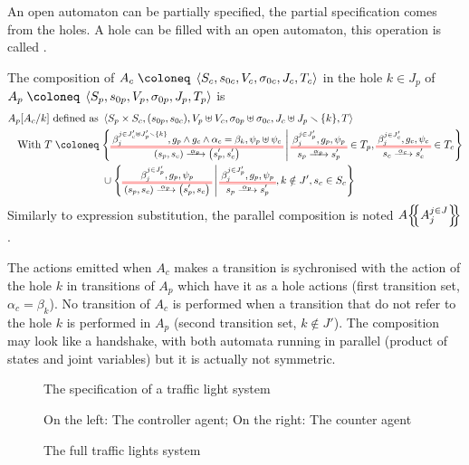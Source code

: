 \documentclass{article}
\begin{document}
An open automaton can be partially specified, the partial specification comes from the holes.
A hole can be filled with an open automaton, this operation is called .
\begin{defi}
The composition of \(A_c \defobject \OA{S_c}{s_{0c}}{V_c}{\sigma_{0c}}{J_c}{T_c}\) in the hole \(k \in J_p\) of \(A_p \defobject \OA{S_p}{s_{0p}}{V_p}{\sigma_{0p}}{J_p}{T_p}\) is
\begin{align*}
	A_p\subst{A_c}{k} \defnotation & \OA{S_p \times S_c}{\mpar{s_{0p}, s_{0c}}}{V_p \uplus V_c}{\sigma_{0p} \uplus \sigma_{0c}}{J_c \uplus J_p \setminus \mbrc{k}}{T} \\
	\text{With } T \defobject & \mset{\OT{\mpar{s_p, s_c}}{\mpar{s'_p, s'_c}}{\alpha_p}{\beta_j^{j \in J'_c \uplus J'_p \setminus \mbrc{k}}}{g_p \wedge g_c \wedge \alpha_c = \beta_k}{\psi_p \uplus \psi_c}}{\OTx{p}{}{}{p} \in T_p, \OTx{c}{}{}{c} \in T_c} \\
	& \cup \mset{\OT{\mpar{s_p, s_c}}{\mpar{s'_p, s_c}}{\alpha_p}{\beta_j^{j \in J'_p}}{g_p}{\psi_p}}{\OTx{p}{}{}{p}, k \notin J', s_c \in S_c}
\end{align*}
Similarly to expression substitution, the parallel composition is noted \(A{\left\{\!\!{\left\{A_j^{j \in J}\right\}}\!\!\right\}}\).
\end{defi}
The actions emitted when \(A_c\) makes a transition is sychronised with the action of the hole \(k\) in transitions of \(A_p\) which have it as a hole actions (first transition set, \(\alpha_c = \beta_k\)).
No transition of \(A_c\) is performed when a transition that do not refer to the hole \(k\) is performed in \(A_p\) (second transition set, \(k \notin J'\)).
The composition may look like a handshake, with both automata running in parallel (product of states and joint variables) but it is actually not symmetric.
\begin{exi}
\begin{figure}
\centering

\caption{The specification of a traffic light system}
\label{fig:tls}
\end{figure}
\begin{figure}
\centering

\vrule

\caption{On the left: The controller agent; On the right: The counter agent}
\label{fig:tlh}
\end{figure}
\begin{figure}
\centering

\caption{The full traffic lights system}
\label{fig:tlf}
\end{figure}
\end{exi}
\end{document}
